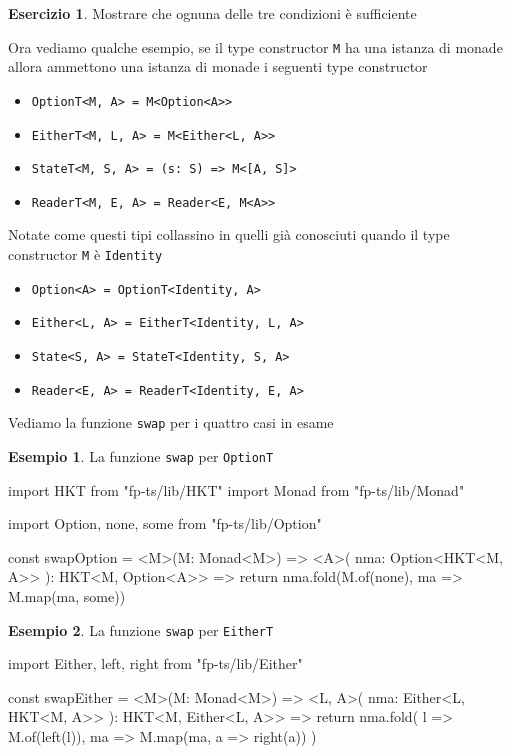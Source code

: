 \documentclass[12pt]{article}
\theoremstyle{definition}
\newtheorem{example}{Esempio}[section]
\newtheorem{exercise}{Esercizio}[section]
\newenvironment{code}
  {\vspace{0.5cm} \VerbatimEnvironment\begin{typescriptcode}}
  {\end{typescriptcode} \vspace{0.2cm}}
\begin{document}
\begin{exercise}
Mostrare che ognuna delle tre condizioni è sufficiente
\end{exercise}

Ora vediamo qualche esempio, se il type constructor \texttt{M} ha una istanza di monade
allora ammettono una istanza di monade i seguenti type constructor

\begin{itemize}
  \item \texttt{OptionT<M, A> = M<Option<A>>}
  \item \texttt{EitherT<M, L, A> = M<Either<L, A>>}
  \item \texttt{StateT<M, S, A> = (s: S) => M<[A, S]>}
  \item \texttt{ReaderT<M, E, A> = Reader<E, M<A>>}
\end{itemize}

Notate come questi tipi collassino in quelli già conosciuti quando il type constructor \texttt{M} è \texttt{Identity}

\begin{itemize}
  \item \texttt{Option<A> = OptionT<Identity, A>}
  \item \texttt{Either<L, A> = EitherT<Identity, L, A>}
  \item \texttt{State<S, A> = StateT<Identity, S, A>}
  \item \texttt{Reader<E, A> = ReaderT<Identity, E, A>}
\end{itemize}

Vediamo la funzione \texttt{swap} per i quattro casi in esame

\begin{example}
La funzione \texttt{swap} per \texttt{OptionT}

\begin{code}
import { HKT } from "fp-ts/lib/HKT"
import { Monad } from "fp-ts/lib/Monad"

import { Option, none, some } from "fp-ts/lib/Option"

const swapOption = <M>(M: Monad<M>) => <A>(
  nma: Option<HKT<M, A>>
): HKT<M, Option<A>> => {
  return nma.fold(M.of(none), ma => M.map(ma, some))
}
\end{code}
\end{example}

\begin{example}
La funzione \texttt{swap} per \texttt{EitherT}

\begin{code}
import { Either, left, right } from "fp-ts/lib/Either"

const swapEither = <M>(M: Monad<M>) => <L, A>(
  nma: Either<L, HKT<M, A>>
): HKT<M, Either<L, A>> => {
  return nma.fold(
    l => M.of(left(l)),
    ma => M.map(ma, a => right(a))
  )
}
\end{code}
\end{example}
\end{document}
